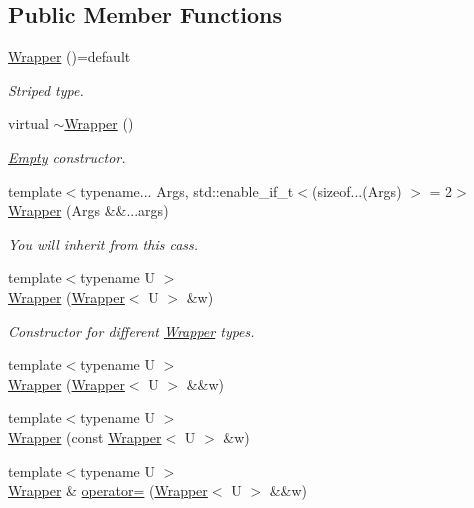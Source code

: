 \subsection*{Public Member Functions}
\begin{DoxyCompactItemize}
\item 
\hyperlink{structhandy_1_1Wrapper_a2fac6164551630fad00e54fecd39b0a6}{Wrapper} ()=default
\begin{DoxyCompactList}\small\item\em Striped type. \end{DoxyCompactList}\item 
virtual \hyperlink{structhandy_1_1Wrapper_a8e0c5885406b4542721956bd6d6c8049}{$\sim$\+Wrapper} ()
\begin{DoxyCompactList}\small\item\em \hyperlink{structhandy_1_1Empty}{Empty} constructor. \end{DoxyCompactList}\item 
{\footnotesize template$<$typename... Args, std\+::enable\+\_\+if\+\_\+t$<$(sizeof...(\+Args) $>$  = 2$>$ }\\\hyperlink{structhandy_1_1Wrapper_a7c92a427a01306baff3c5d405729f0be}{Wrapper} (Args \&\&...args)
\begin{DoxyCompactList}\small\item\em You will inherit from this cass. \end{DoxyCompactList}\item 
{\footnotesize template$<$typename U $>$ }\\\hyperlink{structhandy_1_1Wrapper_ae79e80e5210c6db785c2dae8ac42ca89}{Wrapper} (\hyperlink{structhandy_1_1Wrapper}{Wrapper}$<$ U $>$ \&w)
\begin{DoxyCompactList}\small\item\em Constructor for different \hyperlink{structhandy_1_1Wrapper}{Wrapper} types. \end{DoxyCompactList}\item 
{\footnotesize template$<$typename U $>$ }\\\hyperlink{structhandy_1_1Wrapper_ae4392cad0c488e5e45188dbe1802d1b1}{Wrapper} (\hyperlink{structhandy_1_1Wrapper}{Wrapper}$<$ U $>$ \&\&w)
\item 
{\footnotesize template$<$typename U $>$ }\\\hyperlink{structhandy_1_1Wrapper_a0ffd68247651801bd02fa3c90f2c180a}{Wrapper} (const \hyperlink{structhandy_1_1Wrapper}{Wrapper}$<$ U $>$ \&w)
\item 
{\footnotesize template$<$typename U $>$ }\\\hyperlink{structhandy_1_1Wrapper}{Wrapper} \& \hyperlink{structhandy_1_1Wrapper_a08809e372d068d5e62066292de23fee5}{operator=} (\hyperlink{structhandy_1_1Wrapper}{Wrapper}$<$ U $>$ \&\&w)

\end{DoxyCompactItemize}
